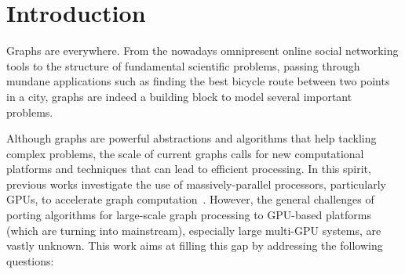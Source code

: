 \section{Introduction}
Graphs are everywhere. From the nowadays omnipresent online social networking tools to the structure of fundamental scientific problems, passing through mundane applications such as finding the best bicycle route between two points in a city, graphs are indeed a building block to model several important problems.

Although graphs are powerful abstractions and algorithms that help tackling complex problems, the scale of current graphs calls for new computational platforms and techniques that can lead to efficient processing. In this spirit, previous works investigate the use of massively-parallel processors, particularly GPUs, to accelerate graph computation~\cite{Harish2007, Katz2008, Sungpack2010, dehne2010exploring}. However, the general challenges of porting algorithms for large-scale graph processing to GPU-based platforms (which are turning into mainstream), especially large multi-GPU systems, are vastly unknown. This work aims at filling this gap by addressing the following questions:

